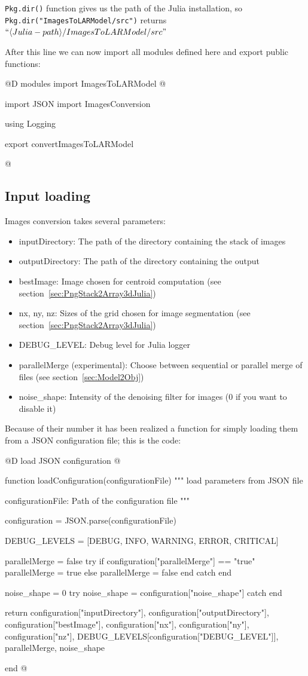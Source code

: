 \documentclass[11pt,oneside]{article}	%
\begin{document}
\texttt{Pkg.dir()} function gives us the path of the Julia installation, so \texttt{Pkg.dir("ImagesToLARModel/src")} returns $``\langle Julia-path\rangle /ImagesToLARModel/src"$

After this line we can now import all modules defined here and export public functions:

@D modules import ImagesToLARModel
@{import JSON
import ImagesConversion

using Logging

export convertImagesToLARModel

@}

\subsection{Input loading}\label{sec:input}

Images conversion takes several parameters:

\begin{itemize}
 \item inputDirectory: The path of the directory containing the stack of images
 \item outputDirectory: The path of the directory containing the output
 \item bestImage: Image chosen for centroid computation (see section~\ref{sec:PngStack2Array3dJulia})
 \item nx, ny, nz: Sizes of the grid chosen for image segmentation (see section~\ref{sec:PngStack2Array3dJulia})
 \item DEBUG\_LEVEL: Debug level for Julia logger
 \item parallelMerge (experimental): Choose between sequential or parallel merge of files (see section~\ref{sec:Model2Obj})
 \item noise\_shape: Intensity of the denoising filter for images (0 if you want to disable it)
\end{itemize}

Because of their number it has been realized a function for simply loading them from a JSON configuration file; this is the code:

@D load JSON configuration
@{function loadConfiguration(configurationFile)
  """
  load parameters from JSON file

  configurationFile: Path of the configuration file
  """

  configuration = JSON.parse(configurationFile)

  DEBUG_LEVELS = [DEBUG, INFO, WARNING, ERROR, CRITICAL]

  parallelMerge = false
  try
    if configuration["parallelMerge"] == "true"
      parallelMerge = true
    else
      parallelMerge = false
    end
  catch
  end
  
  noise_shape = 0
  try
    noise_shape = configuration["noise_shape"]
  catch
  end
  
  return configuration["inputDirectory"], configuration["outputDirectory"],
	configuration["bestImage"],
        configuration["nx"], configuration["ny"], configuration["nz"],
        DEBUG_LEVELS[configuration["DEBUG_LEVEL"]],
        parallelMerge, noise_shape

end
@}
\end{document}
